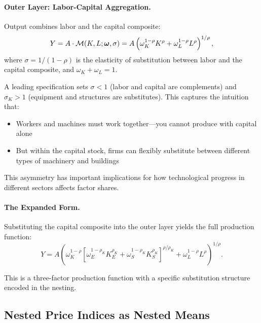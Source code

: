 \paragraph{Outer Layer: Labor-Capital Aggregation.}
Output combines labor and the capital composite:
\begin{equation}
Y = A \cdot \mathcal{M}(K, L; \boldsymbol{\omega}, \sigma) = A \left( \omega_K^{1-\rho} K^{\rho} + \omega_L^{1-\rho} L^{\rho} \right)^{1/\rho},
\label{eq:outer-aggregator}
\end{equation}
where $\sigma = 1/(1-\rho)$ is the elasticity of substitution between labor and the capital composite, and $\omega_K + \omega_L = 1$.

\begin{calloutimportant}
A leading specification sets $\sigma < 1$ (labor and capital are complements) and $\sigma_K > 1$ (equipment and structures are substitutes). This captures the intuition that:
\begin{itemize}[nosep]
\item Workers and machines must work together---you cannot produce with capital alone
\item But within the capital stock, firms can flexibly substitute between different types of machinery and buildings
\end{itemize}
This asymmetry has important implications for how technological progress in different sectors affects factor shares.
\end{calloutimportant}

\paragraph{The Expanded Form.}
Substituting the capital composite into the outer layer yields the full production function:
\begin{equation}
Y = A \left( \omega_K^{1-\rho} \left[ \omega_E^{1-\rho_K} K_E^{\rho_K} + \omega_S^{1-\rho_K} K_S^{\rho_K} \right]^{\rho/\rho_K} + \omega_L^{1-\rho} L^{\rho} \right)^{1/\rho}.
\label{eq:nested-expanded}
\end{equation}

This is a three-factor production function with a specific substitution structure encoded in the nesting.

\subsection{Nested Price Indices as Nested Means}
\label{subsec:nested-price-indices}

